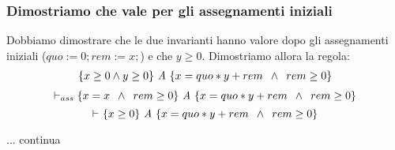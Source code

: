 \begin{esempio}
				      				\subsubsection{Dimostriamo che vale per gli assegnamenti iniziali}
				      				Dobbiamo dimostrare che le due invarianti hanno valore dopo gli assegnamenti iniziali ($quo := 0; rem := x;$) e che $y\geq0$. 
				      				Dimostriamo allora la regola:
				      				\begin{align}
				      				\{x\geq 0 \land y\geq 0\}\mbox{ \textit{A} }\{x=quo*y + rem\,\,\,\land\,\,\,rem \geq 0\}
				      				    \label{ToCheck2}
				      				\end{align}
				      				\[\vdash_{ass}\{x=x\,\,\,\land\,\,\,rem \geq 0\}\mbox{ \textit{A} }\{x=quo*y + rem\,\,\,\land\,\,\,rem \geq 0\}\]
				      				\[\vdash_{}\{x \geq 0\}\mbox{ \textit{A} }\{x=quo*y + rem\,\,\,\land\,\,\,rem \geq 0\}\]
				      				
				      				... continua
				      			\end{esempio}

